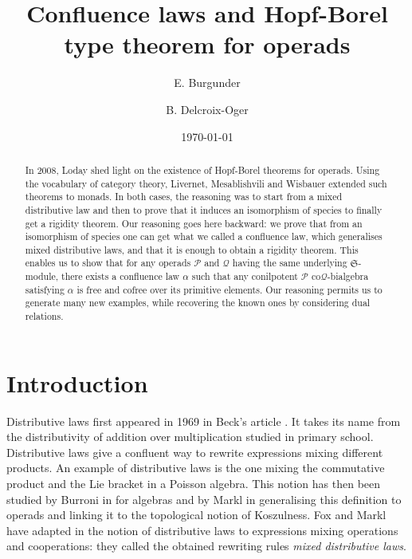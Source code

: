 \documentclass[11pt,leqno]{amsart}
\title[Hopf-Borel type theorem for operads]{Confluence laws and Hopf-Borel type theorem for operads}
\author{E. Burgunder \and B. Delcroix-Oger}
\date{\today}
\theoremstyle{definition}
\theoremstyle{plain}
\begin{document}
\maketitle

\begin{abstract}
In 2008, Loday shed light on the existence of Hopf-Borel theorems for operads. Using the vocabulary of category theory, Livernet, Mesablishvili and Wisbauer extended such theorems to monads. In both cases, the reasoning was to start from a mixed distributive law and then to prove that it induces an isomorphism of species to finally get a rigidity theorem. Our reasoning goes here backward: we prove that from an isomorphism of species one can get what we called a confluence law, which generalises mixed distributive laws, and that it is enough to obtain a rigidity theorem. This enables us to show that for any operads $\mathcal{P}$ and $\mathcal{Q}$ having the same underlying $\mathfrak{S}$-module, there exists a confluence law $\alpha$ such that any conilpotent $\mathcal{P}$ co$\mathcal{Q}$-bialgebra satisfying $\alpha$ is free and cofree over its primitive elements. Our reasoning permits us to generate many new examples, while recovering the known ones by considering dual relations.
\end{abstract}

\section*{Introduction}

Distributive laws first appeared in 1969 in Beck's article \cite{Beck}. It takes its
 name from the distributivity of addition over multiplication studied in primary school. Distributive laws give a confluent way to rewrite expressions 
 mixing different products. An example of distributive laws is the one mixing the 
 commutative product and the Lie bracket in a Poisson algebra. This notion has then been 
 studied by Burroni in \cite{Burroni} for algebras and by Markl in \cite{Markl2} 
 generalising this definition to operads and linking it to the topological notion of 
 Koszulness. Fox and Markl have adapted in \cite{Markl-Fox} the notion of distributive 
 laws to expressions mixing operations and cooperations: they called the obtained 
 rewriting rules \emph{mixed distributive laws}.
\end{document}
